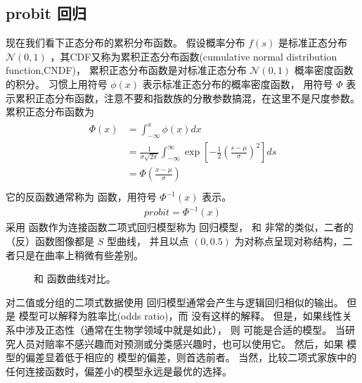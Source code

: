 \documentclass[letterpaper,10pt,english]{sphinxmanual}
\begin{document}
\subsection{probit 回归}
\label{\detokenize{_u4e8c_u9879_u6a21_u578b/content:probit}}
现在我们看下正态分布的累积分布函数。
假设概率分布 \(f(s)\)
是标准正态分布 \(\mathcal{N}(0,1)\)
，其CDF又称为累积正态分布函数(cumulative normal distribution function,CNDF)，
累积正态分布函数是对标准正态分布 \(\mathcal{N}(0,1)\) 概率密度函数的积分。
习惯上用符号 \(\phi(x)\) 表示标准正态分布的概率密度函数，
用符号 \(\Phi\) 表示累积正态分布函数，注意不要和指数族的分散参数搞混，在这里不是尺度参数。
累积正态分布函数为
\begin{align}\label{equation:二项模型/content:二项模型/content:44}\!\begin{aligned}
\Phi(x) &=\int_{-\infty}^x \phi(x) dx\\
&= \frac{1}{\sigma\sqrt{2\pi}} \int_{-\infty}^{\infty}
 \exp \left [ -\frac{1}{2} \left ( \frac{s-\mu}{\sigma} \right )^2 \right ] ds\\
&= \Phi(\frac{x-\mu}{\sigma})\\
\end{aligned}\end{align}
它的反函数通常称为  函数，用符号 \(\Phi^{-1}(x)\) 表示。
\begin{equation}\label{equation:二项模型/content:二项模型/content:45}
\begin{split}probit = \Phi^{-1}(x)\end{split}
\end{equation}
采用  函数作为连接函数二项式回归模型称为  回归模型，
 和  非常的类似，二者的（反）函数图像都是 \(S\) 型曲线，
并且以点 \((0,0.5)\) 为对称点呈现对称结构，二者只是在曲率上稍微有些差别。

\begin{figure}[htbp]
\centering
\capstart

\noindent{}
\caption{ 和  函数曲线对比。}\label{\detokenize{_u4e8c_u9879_u6a21_u578b/content:id13}}\label{\detokenize{_u4e8c_u9879_u6a21_u578b/content:fg-binomial-02}}\end{figure}

对二值或分组的二项式数据使用  回归模型通常会产生与逻辑回归相似的输出。
但是  模型可以解释为胜率比(odds ratio)，而  没有这样的解释。
但是，如果线性关系中涉及正态性（通常在生物学领域中就是如此），
则  可能是合适的模型。
当研究人员对赔率不感兴趣而对预测或分类感兴趣时，也可以使用它。
然后，如果  模型的偏差显着低于相应的  模型的偏差，则首选前者。
当然，比较二项式家族中的任何连接函数时，偏差小的模型永远是最优的选择。
\end{document}

